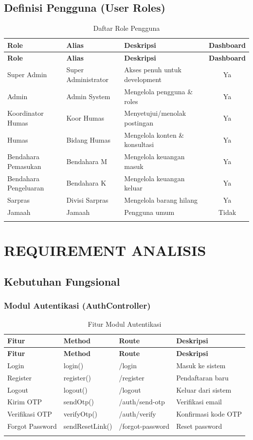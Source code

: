\documentclass[12pt,a4paper]{article}
\begin{document}
\subsection{Definisi Pengguna (User Roles)}
\begin{longtable}{|l|l|p{6cm}|c|}
\hline
\textbf{Role} & \textbf{Alias} & \textbf{Deskripsi} & \textbf{Dashboard} \\
\hline
\endfirsthead
\hline
\textbf{Role} & \textbf{Alias} & \textbf{Deskripsi} & \textbf{Dashboard} \\
\hline
\endhead
Super Admin & Super Administrator & Akses penuh untuk development & Ya \\
Admin & Admin System & Mengelola pengguna \& roles & Ya \\
Koordinator Humas & Koor Humas & Menyetujui/menolak postingan & Ya \\
Humas & Bidang Humas & Mengelola konten \& konsultasi & Ya \\
Bendahara Pemasukan & Bendahara M & Mengelola keuangan masuk & Ya \\
Bendahara Pengeluaran & Bendahara K & Mengelola keuangan keluar & Ya \\
Sarpras & Divisi Sarpras & Mengelola barang hilang & Ya \\
Jamaah & Jamaah & Pengguna umum & Tidak \\
\hline
\caption{Daftar Role Pengguna}
\end{longtable}

\newpage

\section{REQUIREMENT ANALISIS}

\subsection{Kebutuhan Fungsional}

\subsubsection{Modul Autentikasi (AuthController)}
\begin{longtable}{|l|l|l|p{4cm}|}
\hline
\textbf{Fitur} & \textbf{Method} & \textbf{Route} & \textbf{Deskripsi} \\
\hline
\endfirsthead
\hline
\textbf{Fitur} & \textbf{Method} & \textbf{Route} & \textbf{Deskripsi} \\
\hline
\endhead
Login & login() & /login & Masuk ke sistem \\
Register & register() & /register & Pendaftaran baru \\
Logout & logout() & /logout & Keluar dari sistem \\
Kirim OTP & sendOtp() & /auth/send-otp & Verifikasi email \\
Verifikasi OTP & verifyOtp() & /auth/verify & Konfirmasi kode OTP \\
Forgot Password & sendResetLink() & /forgot-password & Reset password \\
\hline
\caption{Fitur Modul Autentikasi}
\end{longtable}
\end{document}
